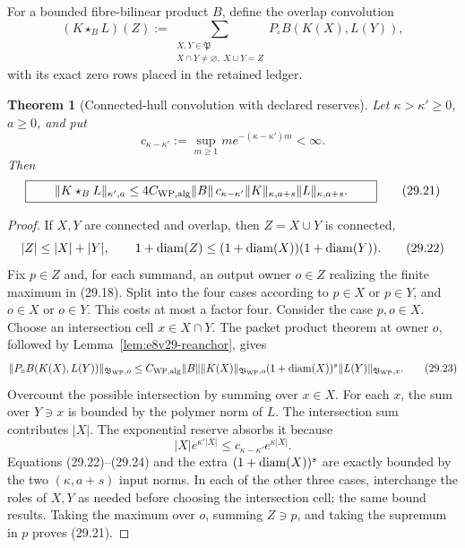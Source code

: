 \documentclass[11pt,oneside]{book}
\newtheorem{theorem}{Theorem}[chapter]
\theoremstyle{definition}
\theoremstyle{remark}
\begin{document}
For a bounded fibre-bilinear product \(B\), define the overlap
convolution
\[
 (K\star_B L)(Z)
 :=
 \sum_{\substack{X,Y\in{\mathfrak P}\\
 X\cap Y\ne\varnothing,\ X\cup Y=Z}}
 P_\circ B(K(X),L(Y)),                                           \tag{29.19}
\]
with its exact zero rows placed in the retained ledger.

\begin{theorem}[Connected-hull convolution with declared reserves]
\label{thm:e8v29-hull}
Let \(\kappa>\kappa'\geq0\), \(a\geq0\), and put
\[
 c_{\kappa-\kappa'}
 :=\sup_{m\geq1}m e^{-(\kappa-\kappa')m}<\infty.                  \tag{29.20}
\]
Then
\[
\boxed{\qquad
 \|K\star_B L\|_{\kappa',a}
 \leq
 4C_{\rm WP,alg}\|B\|\,
 c_{\kappa-\kappa'}
 \|K\|_{\kappa,a+s}\|L\|_{\kappa,a+s}.
\qquad}                                                           \tag{29.21}
\]
\end{theorem}

\begin{proof}
If \(X,Y\) are connected and overlap, then \(Z=X\cup Y\) is connected,
\[
 |Z|\leq|X|+|Y|,\qquad
 1+{\rm diam}(Z)
 \leq(1+{\rm diam}(X))(1+{\rm diam}(Y)).                         \tag{29.22}
\]
Fix \(p\in Z\) and, for each summand, an output owner \(o\in Z\)
realizing the finite maximum in (29.18).  Split into the four cases
according to \(p\in X\) or \(p\in Y\), and \(o\in X\) or \(o\in Y\).
This costs at most a factor four.  Consider the case
\(p,o\in X\).  Choose an intersection cell \(x\in X\cap Y\).
The packet product theorem at owner \(o\), followed by
Lemma~\ref{lem:e8v29-reanchor}, gives
\[
\begin{split}
 \|P_\circ B(K(X),L(Y))\|_{\mathfrak B_{\rm WP},o}
 \leq C_{\rm WP,alg}\|B\|
 \|K(X)\|_{\mathfrak B_{\rm WP},o}
 (1+{\rm diam}(X))^s
 \|L(Y)\|_{\mathfrak B_{\rm WP},x}.                             \tag{29.23}
\end{split}
\]
Overcount the possible intersection by summing over \(x\in X\).
For each \(x\), the sum over \(Y\ni x\) is bounded by the polymer norm
of \(L\).  The intersection sum contributes \(|X|\).  The exponential
reserve absorbs it because
\[
 |X|e^{\kappa'|X|}
 \leq c_{\kappa-\kappa'}e^{\kappa|X|}.                           \tag{29.24}
\]
Equations (29.22)--(29.24) and the extra
\((1+{\rm diam}(X))^s\) are exactly bounded by the two
\((\kappa,a+s)\) input norms.  In each of the other three cases,
interchange the roles of \(X,Y\) as needed before choosing the
intersection cell; the same bound results.
Taking the maximum over \(o\), summing \(Z\ni p\), and taking the
supremum in \(p\) proves (29.21).
\end{proof}
\end{document}
